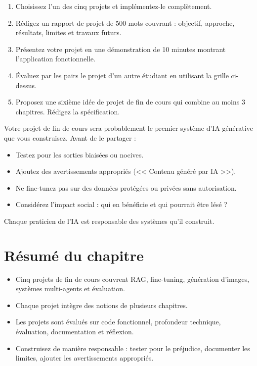 \begin{exercise}
\begin{enumerate}
  \item Choisissez l'un des cinq projets et impl\'ementez-le compl\`etement.
  \item R\'edigez un rapport de projet de 500 mots couvrant : objectif, approche, r\'esultats, limites et travaux futurs.
  \item Pr\'esentez votre projet en une d\'emonstration de 10 minutes montrant l'application fonctionnelle.
  \item \'Evaluez par les pairs le projet d'un autre \'etudiant en utilisant la grille ci-dessus.
  \item Proposez une sixi\`eme id\'ee de projet de fin de cours qui combine au moins 3 chapitres. R\'edigez la sp\'ecification.
\end{enumerate}
\end{exercise}

\begin{ethicsbox}
Votre projet de fin de cours sera probablement le premier syst\`eme d'IA g\'en\'erative que vous construisez. Avant de le partager :
\begin{itemize}
  \item Testez pour les sorties biais\'ees ou nocives.
  \item Ajoutez des avertissements appropri\'es (<< Contenu g\'en\'er\'e par IA >>).
  \item Ne fine-tunez pas sur des donn\'ees prot\'eg\'ees ou priv\'ees sans autorisation.
  \item Consid\'erez l'impact social : qui en b\'en\'eficie et qui pourrait \^etre l\'es\'e ?
\end{itemize}
Chaque praticien de l'IA est responsable des syst\`emes qu'il construit.
\end{ethicsbox}

\section{R\'esum\'e du chapitre}

\begin{itemize}
  \item Cinq projets de fin de cours couvrent RAG, fine-tuning, g\'en\'eration d'images, syst\`emes multi-agents et \'evaluation.
  \item Chaque projet int\`egre des notions de plusieurs chapitres.
  \item Les projets sont \'evalu\'es sur code fonctionnel, profondeur technique, \'evaluation, documentation et r\'eflexion.
  \item Construisez de mani\`ere responsable : tester pour le pr\'ejudice, documenter les limites, ajouter les avertissements appropri\'es.
\end{itemize}
